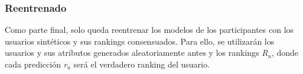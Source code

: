 \subsubsection{Reentrenado}
Como parte final, solo queda reentrenar los modelos de los participantes con los usuarios sintéticos y sus rankings consensuados. Para ello, se utilizarán los usuarios y sus atributos generados aleatoriamente antes y los rankings \textit{R$_{u}$}, donde cada predicción \textit{r$_{u}$} será el verdadero ranking del usuario.
